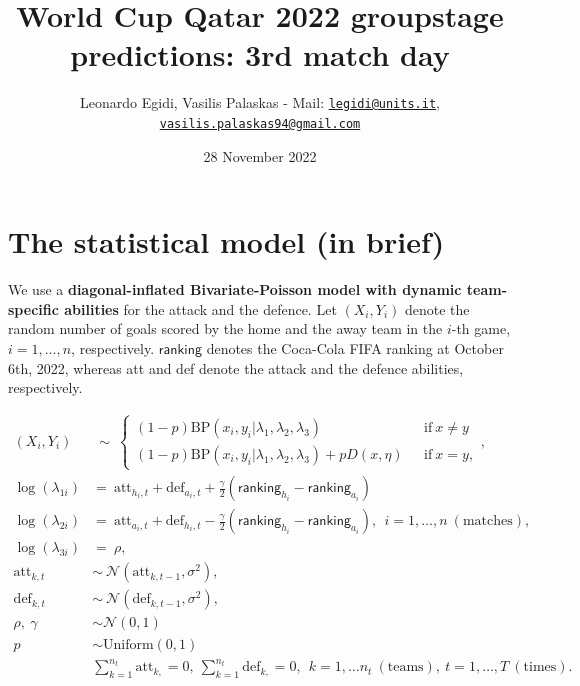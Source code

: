 \documentclass[
  10pt,
]{article}
\title{World Cup Qatar 2022 groupstage predictions: 3rd match day}
\author{Leonardo Egidi, Vasilis Palaskas - Mail:
\href{mailto:legidi@units.it}{\nolinkurl{legidi@units.it}},
\href{mailto:vasilis.palaskas94@gmail.com}{\nolinkurl{vasilis.palaskas94@gmail.com}}}
\date{28 November 2022}
\begin{document}
\maketitle

{
\setcounter{tocdepth}{2}
\tableofcontents
}
\hypertarget{the-statistical-model-in-brief}{%
\section{The statistical model (in
brief)}\label{the-statistical-model-in-brief}}

We use a \textbf{diagonal-inflated Bivariate-Poisson model with dynamic
team-specific abilities} for the attack and the defence. Let
\((X_{i}, Y_{i})\) denote the random number of goals scored by the home
and the away team in the \(i\)-th game, \(i=1,\ldots,n\), respectively.
\(\mathsf{ranking}\) denotes the Coca-Cola FIFA ranking at October 6th,
2022, whereas att and def denote the attack and the defence abilities,
respectively.

\begin{align}
(X_i, Y_i) &\ \sim \ \begin{cases} (1-p) \text{BP}(x_i, y_i |\lambda_1, \lambda_2, \lambda_3) \ \ \ & \text{if} \    x \ne y \\ (1-p) \text{BP}(x_i, y_i | \lambda_1, \lambda_2, \lambda_3) + pD(x, \eta) \ \ \ & \text{if} \   x = y, \end{cases}, \\
\log(\lambda_{1i}) &=\    \text{att}_{h_i, t}+ \text{def}_{a_i,t} + \frac{\gamma}{2}(\mathsf{ranking}_{h_i}-\mathsf{ranking}_{a_i}) \\
\log(\lambda_{2i}) & =\    \text{att}_{a_i,t} + \text{def}_{h_i,t} - \frac{\gamma}{2}(\mathsf{ranking}_{h_i}-\mathsf{ranking}_{a_i}), \ \ i=1,\ldots,n\ (\text{matches}), \\
\log(\lambda_{3i}) & =\ \rho,\\
\text{att}_{k, t}&  \sim \ \mathcal{N}(\text{att}_{k, t-1}, \sigma^2), \\
\text{def}_{k, t} & \sim \  \mathcal{N}(\text{def}_{k, t-1}, \sigma^2),\\
\rho, \ \gamma & \sim \mathcal{N}(0,1) \\
p & \sim \text{Uniform}(0,1)\\
& \sum_{k=1}^{n_t} \text{att}_{k, }=0, \  \sum_{k=1}^{n_t}\text{def}_{k, }=0, \ \ k=1,\ldots n_t \ (\text{teams}), \  t=1,\ldots, T \ (\text{times}).
\label{eq:scoring_rue}
\end{align}
\end{document}
